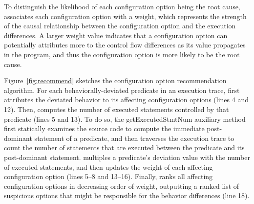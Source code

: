 To distinguish the likelihood of each configuration
option being the root cause, \ourtool associates each
configuration option with a weight, which represents the strength of
the causal relationship between the configuration option
and the execution differences.
A larger weight value indicates that a configuration option
can potentially attributes more to the control
flow differences as its value propagates in the program, and thus
the configuration option is more likely to be the root cause.

Figure~\ref{fig:recommend} sketches the configuration option
recommendation algorithm.
For each behaviorally-deviated predicate in an execution trace,
\ourtool first attributes the deviated behavior
to its affecting configuration options (lines 4 and 12). Then,
\ourtool computes the number of executed statements controlled
by that predicate (lines 5 and 13). To do so, 
the getExecutedStmtNum auxiliary method first statically examines the
source code to compute the immediate post-dominant statement
of a predicate, and then traverses the execution trace to count
the number of statements that
are executed between the predicate and its post-dominant
statement. 
\ourtool multiples a predicate's deviation value 
with the number of executed statements, and then updates the
weight of each affecting configuration option (lines 5--8
and 13--16).
Finally, \ourtool ranks all affecting configuration options
in decreasing order of weight, outputting a ranked list of suspicious
options that might be responsible for the
behavior differences (line 18). 


